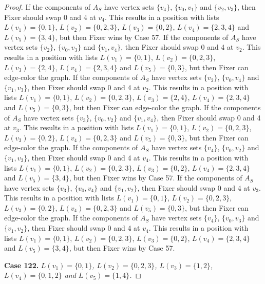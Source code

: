 \documentclass[12pt]{amsart}
\theoremstyle{plain}
\theoremstyle{definition}
\theoremstyle{remark}
\begin{document}
\begin{proof}
If the components of $A_S$ have vertex sets $\{v_4\}$, $\{v_0, v_1\}$ and $\{v_2, v_3\}$, then Fixer should swap 0 and 4 at $v_4$. This results in a position with lists $L(v_1) = \{0, 1\}$, $L(v_2) = \{0, 2, 3\}$, $L(v_3) = \{0, 2\}$, $L(v_4) = \{2, 3, 4\}$ and $L(v_5) = \{3, 4\}$, but then Fixer wins by Case 57.
If the components of $A_S$ have vertex sets $\{v_2\}$, $\{v_0, v_3\}$ and $\{v_1, v_4\}$, then Fixer should swap 0 and 4 at $v_2$. This results in a position with lists $L(v_1) = \{0, 1\}$, $L(v_2) = \{0, 2, 3\}$, $L(v_3) = \{2, 4\}$, $L(v_4) = \{2, 3, 4\}$ and $L(v_5) = \{0, 3\}$, but then Fixer can edge-color the graph.
If the components of $A_S$ have vertex sets $\{v_2\}$, $\{v_0, v_4\}$ and $\{v_1, v_3\}$, then Fixer should swap 0 and 4 at $v_2$. This results in a position with lists $L(v_1) = \{0, 1\}$, $L(v_2) = \{0, 2, 3\}$, $L(v_3) = \{2, 4\}$, $L(v_4) = \{2, 3, 4\}$ and $L(v_5) = \{0, 3\}$, but then Fixer can edge-color the graph.
If the components of $A_S$ have vertex sets $\{v_3\}$, $\{v_0, v_2\}$ and $\{v_1, v_4\}$, then Fixer should swap 0 and 4 at $v_3$. This results in a position with lists $L(v_1) = \{0, 1\}$, $L(v_2) = \{0, 2, 3\}$, $L(v_3) = \{0, 2\}$, $L(v_4) = \{0, 2, 3\}$ and $L(v_5) = \{0, 3\}$, but then Fixer can edge-color the graph.
If the components of $A_S$ have vertex sets $\{v_4\}$, $\{v_0, v_2\}$ and $\{v_1, v_3\}$, then Fixer should swap 0 and 4 at $v_4$. This results in a position with lists $L(v_1) = \{0, 1\}$, $L(v_2) = \{0, 2, 3\}$, $L(v_3) = \{0, 2\}$, $L(v_4) = \{2, 3, 4\}$ and $L(v_5) = \{3, 4\}$, but then Fixer wins by Case 57.
If the components of $A_S$ have vertex sets $\{v_3\}$, $\{v_0, v_4\}$ and $\{v_1, v_2\}$, then Fixer should swap 0 and 4 at $v_3$. This results in a position with lists $L(v_1) = \{0, 1\}$, $L(v_2) = \{0, 2, 3\}$, $L(v_3) = \{0, 2\}$, $L(v_4) = \{0, 2, 3\}$ and $L(v_5) = \{0, 3\}$, but then Fixer can edge-color the graph.
If the components of $A_S$ have vertex sets $\{v_4\}$, $\{v_0, v_3\}$ and $\{v_1, v_2\}$, then Fixer should swap 0 and 4 at $v_4$. This results in a position with lists $L(v_1) = \{0, 1\}$, $L(v_2) = \{0, 2, 3\}$, $L(v_3) = \{0, 2\}$, $L(v_4) = \{2, 3, 4\}$ and $L(v_5) = \{3, 4\}$, but then Fixer wins by Case 57.

\noindent\textbf{Case 122.  }\textit{$L(v_1) = \{0, 1\}$, $L(v_2) = \{0, 2, 3\}$, $L(v_3) = \{1, 2\}$, $L(v_4) = \{0, 1, 2\}$ and $L(v_5) = \{1, 4\}$.}


\end{proof}
\end{document}
